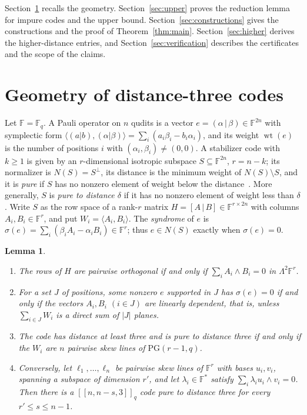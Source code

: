 \documentclass[11pt]{amsart}
\newtheorem{lemma}[theorem]{Lemma}
\theoremstyle{definition}
\theoremstyle{remark}
\newcommand{\F}{\mathbb F}
\newcommand{\wt}{\operatorname{wt}}
\newcommand{\qq}[1]{[\![#1]\!]}
\begin{document}
Section~\ref{sec:geometry} recalls the geometry. Section~\ref{sec:upper} proves the reduction lemma for impure codes and the upper bound. Section~\ref{sec:constructions} gives the constructions and the proof of Theorem~\ref{thm:main}. Section~\ref{sec:higher} derives the higher-distance entries, and Section~\ref{sec:verification} describes the certificates and the scope of the claims.

\section{Geometry of distance-three codes}\label{sec:geometry}

Let $\F=\F_q$. A Pauli operator on $n$ qudits is a vector $e=(\alpha\,|\,\beta)\in\F^{2n}$ with symplectic form $\langle(a|b),(\alpha|\beta)\rangle=\sum_i(a_i\beta_i-b_i\alpha_i)$, and its weight $\wt(e)$ is the number of positions $i$ with $(\alpha_i,\beta_i)\ne(0,0)$. A stabilizer code with $k\ge1$ is given by an $r$-dimensional isotropic subspace $S\subseteq\F^{2n}$, $r=n-k$; its normalizer is $N(S)=S^{\perp}$, its distance is the minimum weight of $N(S)\setminus S$, and it is \emph{pure} if $S$ has no nonzero element of weight below the distance~\cite{AshikhminKnill2001,KKKS2006}. More generally, $S$ is \emph{pure to distance $\delta$} if it has no nonzero element of weight less than $\delta$. Write $S$ as the row space of a rank-$r$ matrix $H=[A\,|\,B]\in\F^{r\times 2n}$ with columns $A_i,B_i\in\F^r$, and put $W_i=\langle A_i,B_i\rangle$. The \emph{syndrome} of $e$ is $\sigma(e)=\sum_i(\beta_iA_i-\alpha_iB_i)\in\F^r$; thus $e\in N(S)$ exactly when $\sigma(e)=0$.

\begin{lemma}\label{lem:geometry}
\begin{enumerate}
\item The rows of $H$ are pairwise orthogonal if and only if $\sum_i A_i\wedge B_i=0$ in $\Lambda^2\F^r$.
\item For a set $J$ of positions, some nonzero $e$ supported in $J$ has $\sigma(e)=0$ if and only if the vectors $A_i,B_i$ $(i\in J)$ are linearly dependent, that is, unless $\sum_{i\in J}W_i$ is a direct sum of $|J|$ planes.
\item The code has distance at least three and is pure to distance three if and only if the $W_i$ are $n$ pairwise skew lines of $\mathrm{PG}(r-1,q)$.
\item Conversely, let $\ell_1,\dots,\ell_n$ be pairwise skew lines of $\F^r$ with bases $u_i,v_i$, spanning a subspace of dimension $r'$, and let $\lambda_i\in\F^\ast$ satisfy $\sum_i\lambda_iu_i\wedge v_i=0$. Then there is a $\qq{n,n-s,3}_q$ code pure to distance three for every $r'\le s\le n-1$.
\end{enumerate}
\end{lemma}
\end{document}
